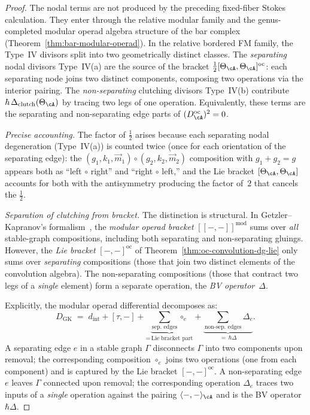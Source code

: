 \begin{proof}
The nodal terms are not produced by the preceding fixed-fiber Stokes
calculation. They enter through the relative modular family and the
genus-completed modular operad algebra structure of the bar complex
(Theorem~\textup{\ref{thm:bar-modular-operad}}). In the relative
bordered FM family, the Type~IV divisors split into two geometrically
distinct classes. The \emph{separating} nodal divisors Type~IV(a) are
the source of the bracket
$\frac{1}{2}[\Theta_\cA, \Theta_\cA]^{\mathrm{oc}}$: each separating
node joins two distinct components, composing two operations via the
interior pairing. The \emph{non-separating} clutching divisors
Type~IV(b) contribute
$\hbar\,\Delta_{\mathrm{clutch}}(\Theta_\cA)$ by tracing two legs of
one operation. Equivalently, these terms are the separating and
non-separating edge parts of
$(D_\cA^{\mathrm{oc}})^2=0$.

\emph{Precise accounting.}
The factor of $\frac{1}{2}$ arises because each separating
nodal degeneration (Type~IV(a)) is counted twice (once for
each orientation of the separating edge): the
$(g_1, k_1, \vec{m}_1)
\circ (g_2, k_2, \vec{m}_2)$ composition with
$g_1 + g_2 = g$ appears both as ``left $\circ$ right'' and
``right $\circ$ left,'' and the Lie bracket
$[\Theta_\cA, \Theta_\cA]$ accounts for both with the
antisymmetry producing the factor of~$2$ that cancels the
$\frac{1}{2}$.

\emph{Separation of clutching from bracket.}
The distinction is structural. In
Getzler--Kapranov's formalism~\cite[\S5]{GeK98}, the
\emph{modular operad bracket} $[\![-,-]\!]^{\mathrm{mod}}$ sums
over \emph{all} stable-graph compositions, including both
separating and non-separating gluings. However, the
\emph{Lie bracket} $[-,-]^{\mathrm{oc}}$ of
Theorem~\ref{thm:oc-convolution-dg-lie} only sums over
\emph{separating} compositions (those that join two distinct
elements of the convolution algebra). The non-separating
compositions (those that contract two legs of a
\emph{single} element) form a separate operation, the
\emph{BV operator}~$\Delta$.

Explicitly, the modular operad differential decomposes as:
\begin{equation}\label{eq:gk-decomposition}
D_{\mathrm{GK}}
\;=\;
d_{\mathrm{int}}
+ [\tau, -]
+ \underbrace{\sum_{\text{sep.\ edges}} \circ_e}_{=\,
 \text{Lie bracket part}}
+ \underbrace{\sum_{\text{non-sep.\ edges}}
 \Delta_e}_{=\, \hbar\Delta}.
\end{equation}
A separating edge $e$ in a stable graph $\Gamma$
disconnects $\Gamma$ into two components upon removal;
the corresponding composition $\circ_e$ joins two
operations (one from each component) and is captured by the
Lie bracket $[-,-]^{\mathrm{oc}}$. A non-separating edge
$e$ leaves $\Gamma$ connected upon removal; the
corresponding operation $\Delta_e$ traces two inputs of a
\emph{single} operation against the pairing
$\langle -, - \rangle_\cA$ and is the BV
operator~$\hbar\Delta$.


\end{proof}
